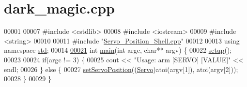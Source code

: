\hypertarget{dark__magic_8cpp_source}{\section{dark\+\_\+magic.\+cpp}
\label{dark__magic_8cpp_source}
}

\begin{DoxyCode}
00001 
00007 \textcolor{preprocessor}{#include <cstdlib>}
00008 \textcolor{preprocessor}{#include <iostream>}
00009 \textcolor{preprocessor}{#include <string>}
00010 
00011 \textcolor{preprocessor}{#include "\hyperlink{Servo__Position__Shell_8cpp}{Servo\_Position\_Shell.cpp}"}
00012 
00013 \textcolor{keyword}{using namespace }\hyperlink{namespacestd}{std};
00014 
\hypertarget{dark__magic_8cpp_source_l00021}{}\hyperlink{dark__magic_8cpp_a3c04138a5bfe5d72780bb7e82a18e627}{00021} \textcolor{keywordtype}{int} \hyperlink{dark__magic_8cpp_a3c04138a5bfe5d72780bb7e82a18e627}{main}(\textcolor{keywordtype}{int} argc, \textcolor{keywordtype}{char}** argv) \{
00022     \hyperlink{Servo__Position__Shell_8cpp_a4fc01d736fe50cf5b977f755b675f11d}{setup}();
00023     
00024     \textcolor{keywordflow}{if}(argc != 3) \{
00025         cout << \textcolor{stringliteral}{"Usage: arm [SERVO] [VALUE]"} << endl;
00026     \} \textcolor{keywordflow}{else} \{
00027         \hyperlink{Servo__Position__Shell_8cpp_abd2cd3c2e36d42a2178a6f2fd12af905}{setServoPosition}((\hyperlink{Servo__Position__Shell_8h_af629c4ae98db77091b130c7fbc31cab2}{Servo})atoi(argv[1]), atoi(argv[2]));
00028     \}
00029 \}
\end{DoxyCode}
